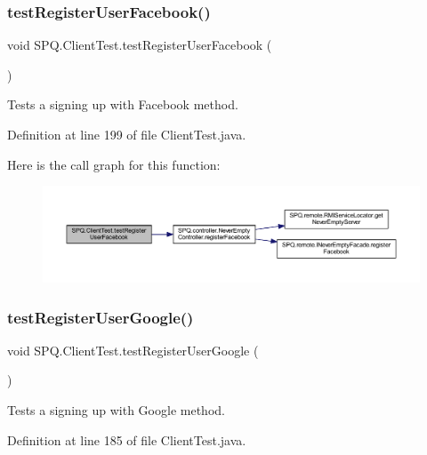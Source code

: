 \subsubsection{\texorpdfstring{test\+Register\+User\+Facebook()}{testRegisterUserFacebook()}}
{\footnotesize\ttfamily void S\+P\+Q.\+Client\+Test.\+test\+Register\+User\+Facebook (\begin{DoxyParamCaption}{ }\end{DoxyParamCaption})}

Tests a signing up with Facebook method. 

Definition at line 199 of file Client\+Test.\+java.

Here is the call graph for this function\+:
\nopagebreak
\begin{figure}[H]
\begin{center}
\leavevmode
\includegraphics[width=350pt]{class_s_p_q_1_1_client_test_ae74ec6f1a9672b8dbffeaf89abe44bbd_cgraph}
\end{center}
\end{figure}
\mbox{\label{class_s_p_q_1_1_client_test_a5f10079da4053b4e2c183b715c246bfa}} 
\subsubsection{\texorpdfstring{test\+Register\+User\+Google()}{testRegisterUserGoogle()}}
{\footnotesize\ttfamily void S\+P\+Q.\+Client\+Test.\+test\+Register\+User\+Google (\begin{DoxyParamCaption}{ }\end{DoxyParamCaption})}

Tests a signing up with Google method. 

Definition at line 185 of file Client\+Test.\+java.

